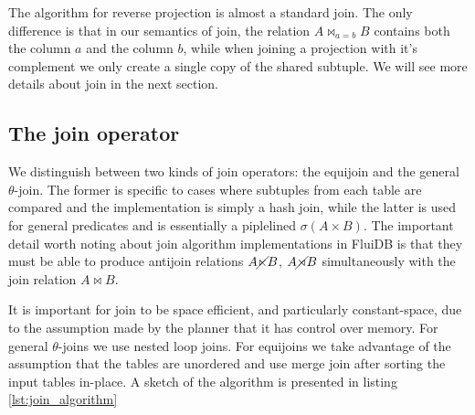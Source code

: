 The algorithm for reverse projection is almost a standard join. The
only difference is that in our semantics of join, the relation \(A
\Join_{a = b} B\) contains both the column \(a\) and the column \(b\),
while when joining a projection with it's complement we only create a
single copy of the shared subtuple. We will see more details about
join in the next section.


\subsection{The join operator}

We distinguish between two kinds of join operators: the equijoin and
the general \(\theta\)-join. The former is specific to cases where
subtuples from each table are compared and the implementation is
simply a hash join, while the latter is used for general predicates
and is essentially a piplelined \(\sigma(A \times B)\). The important
detail worth noting about join algorithm implementations in FluiDB is
that they must be able to produce antijoin relations \(A \cancel\ltimes B\),
\(A \cancel\rtimes B\) simultaneously with the join relation \(A \Join B\).

It is important for join to be space efficient, and particularly
constant-space, due to the assumption made by the planner that it has
control over memory. For general \(\theta\)-joins we use nested loop
joins. For equijoins we take advantage of the assumption that the
tables are unordered and use merge join after sorting the input tables
in-place. A sketch of the algorithm is presented in listing
\ref{lst:join_algorithm}

